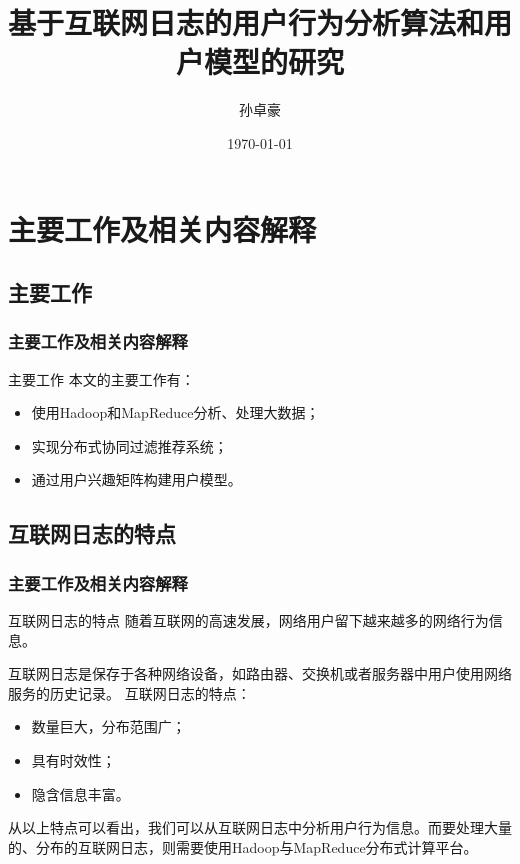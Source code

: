 \documentclass{beamer}
\title{基于互联网日志的用户行为分析算法和用户模型的研究}
\author{孙卓豪}
\institute{南开大学 \& 电子信息科学与技术}
\date{\today}
\begin{document}
\usetikzlibrary{shapes,snakes}
\usetikzlibrary{arrows, decorations.markings}
\begin{frame}
	\titlepage
\end{frame}

\begin{frame}[shrink]
	\tableofcontents
\end{frame}

\section{主要工作及相关内容解释}
\subsection{主要工作}
\begin{frame}
\frametitle{主要工作及相关内容解释}
	\begin{block}{主要工作}
	本文的主要工作有：
	\begin{itemize}
		\item 使用Hadoop和MapReduce分析、处理大数据；
		\item 实现分布式协同过滤推荐系统；
		\item 通过用户兴趣矩阵构建用户模型。
	\end{itemize}
	\end{block}
\end{frame}

\subsection{互联网日志的特点}
\begin{frame}
	\frametitle{主要工作及相关内容解释}
	\begin{block}{互联网日志的特点}
	随着互联网的高速发展，网络用户留下越来越多的网络行为信息。

	互联网日志是保存于各种网络设备，如路由器、交换机或者服务器中用户使用网络服务的历史记录。
	互联网日志的特点：
	\begin{itemize}
		\item 数量巨大，分布范围广；
		\item 具有时效性；
		\item 隐含信息丰富。
	\end{itemize}
	从以上特点可以看出，我们可以从互联网日志中分析用户行为信息。而要处理大量的、分布的互联网日志，则需要使用Hadoop与MapReduce分布式计算平台。
	\end{block}
\end{frame}
\end{document}
